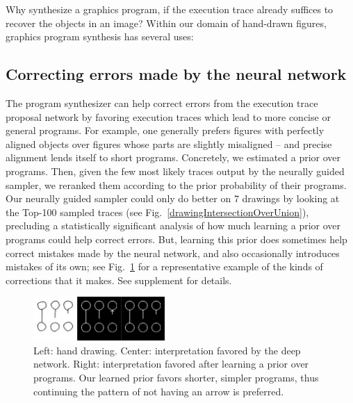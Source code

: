 \documentclass{article}
\newcommand{\remark}[1]{\textcolor{red}{[#1]}}
\begin{document}
Why synthesize a graphics program,
if the execution trace already suffices to recover the objects in an image?
Within our domain of hand-drawn figures, graphics program synthesis has several uses:

\subsection{Correcting errors made by the neural network}\label{synthesizerHelpsParsing}
The program synthesizer can help correct errors from the execution
trace proposal network by favoring execution traces which lead to more
concise or general programs.  For example, one generally prefers
figures with perfectly aligned objects over figures whose parts are
slightly misaligned -- and precise alignment lends itself to short
programs.  Concretely, we estimated a prior over programs. Then,
given the few most likely traces output by the neurally guided sampler,
we reranked them according to the prior probability of their programs.
Our neurally guided sampler could only do better on
7 drawings by looking at the Top-100 sampled traces
(see Fig.~\ref{drawingIntersectionOverUnion}),
precluding a statistically significant analysis of how much
learning a prior over programs could help correct errors.
But,
learning this prior does sometimes
help correct mistakes made by the neural network, and also
occasionally introduces mistakes of its own; see
Fig.~\ref{exampleOfProgramCorrectingMistake} for a representative
example of the kinds of corrections that it makes.
See supplement for details.
\begin{figure}
  \includegraphics[width = 5cm]{figures/programSuccess7.png}
  \caption{Left: hand drawing. Center: interpretation favored by the deep network. Right: interpretation favored after learning a prior over programs. Our learned prior favors shorter, simpler programs, thus continuing the pattern of not having an arrow is preferred.}\label{exampleOfProgramCorrectingMistake}
  \end{figure}
\end{document}
